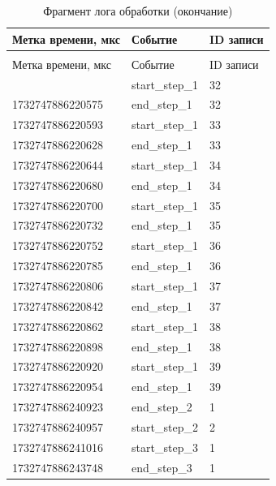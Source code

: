 \begin{longtable}{|p{}|p{}|p{}|}
    \caption{Фрагмент лога обработки (начало)}\label{tbl:b_log}
    \\
    \hline
    Метка времени, мкс & Событие        & ID записи \\
    \hline
    \endfirsthead
    \caption{Фрагмент лога обработки (окончание)}
    \\
    \hline
    Метка времени, мкс   & Событие   & ID записи        \\
    \hline
    \endhead
    \hline
    \endfoot
    \endlastfoot
    \hline
    1732747886220541   & start\_step\_1 & 32        \\\hline
    1732747886220575   & end\_step\_1   & 32        \\\hline
    1732747886220593   & start\_step\_1 & 33        \\\hline
    1732747886220628   & end\_step\_1   & 33        \\\hline
    1732747886220644   & start\_step\_1 & 34        \\\hline
    1732747886220680   & end\_step\_1   & 34        \\\hline
    1732747886220700   & start\_step\_1 & 35        \\\hline
    1732747886220732   & end\_step\_1   & 35        \\\hline
    1732747886220752   & start\_step\_1 & 36        \\\hline
    1732747886220785   & end\_step\_1   & 36        \\\hline
    1732747886220806   & start\_step\_1 & 37        \\\hline
    1732747886220842   & end\_step\_1   & 37        \\\hline
    1732747886220862   & start\_step\_1 & 38        \\\hline
    1732747886220898   & end\_step\_1   & 38        \\\hline
    1732747886220920   & start\_step\_1   & 39         \\\hline
    1732747886220954   & end\_step\_1 & 39         \\\hline
    1732747886240923   & end\_step\_2 & 1         \\\hline
    1732747886240957   & start\_step\_2   & 2         \\\hline
    1732747886241016   & start\_step\_3   & 1         \\\hline
    1732747886243748   & end\_step\_3   & 1         \\\hline
\end{longtable}

